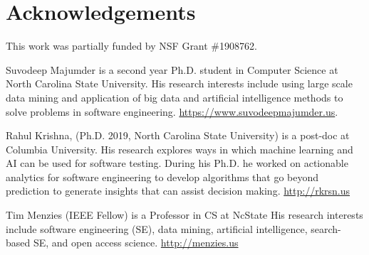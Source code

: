 \documentclass[10pt,journal,compsoc]{IEEEtran}
\begin{document}



\section{Acknowledgements}
\label{sec:ack}

This work was partially funded by NSF Grant \#1908762.
\balance

 

\begin{IEEEbiography}{Suvodeep Majumder}
 is a second year Ph.D. student in Computer Science at North Carolina State University.  
  His research interests include using large scale data mining and application of big data and artificial intelligence methods to solve problems in software engineering.
  \url{https://www.suvodeepmajumder.us}.
\end{IEEEbiography}
\begin{IEEEbiography}{Rahul Krishna}, (Ph.D. 2019, North
Carolina State University) is a post-doc at Columbia University.
His research explores ways in which machine learning and AI can be used for software testing.
During his Ph.D. he worked on actionable analytics for software engineering to  develop algorithms that go beyond prediction to generate insights that can assist decision making.   \url{http://rkrsn.us}
\end{IEEEbiography}
\begin{IEEEbiography}{Tim Menzies} (IEEE Fellow)
is a Professor in CS at NcState  His research interests include software engineering (SE), data mining, artificial intelligence, search-based SE, and open access science. \url{http://menzies.us}
\end{IEEEbiography}




\end{document}
